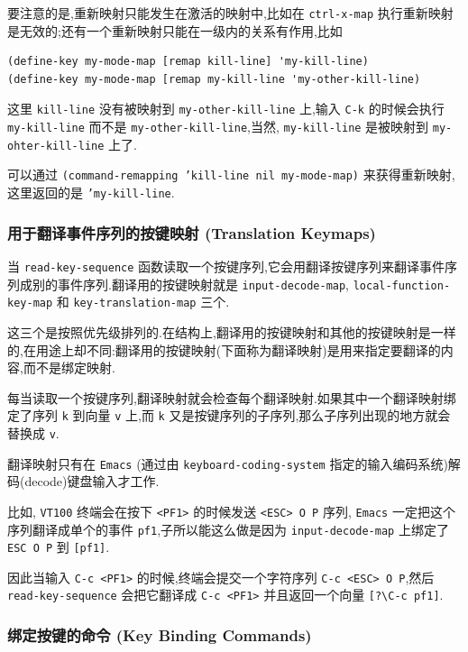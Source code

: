 \documentclass[11pt]{article}
\begin{document}
要注意的是,重新映射只能发生在激活的映射中,比如在 \texttt{ctrl-x-map} 执行重新映射是无效的;还有一个重新映射只能在一级内的关系有作用,比如

\begin{verbatim}
(define-key my-mode-map [remap kill-line] 'my-kill-line)
(define-key my-mode-map [remap my-kill-line 'my-other-kill-line)
\end{verbatim}

这里 \texttt{kill-line} 没有被映射到 \texttt{my-other-kill-line} 上,输入 \texttt{C-k} 的时候会执行 \texttt{my-kill-line} 而不是 \texttt{my-other-kill-line},当然, \texttt{my-kill-line} 是被映射到 \texttt{my-ohter-kill-line} 上了.

可以通过 \texttt{(command-remapping 'kill-line nil my-mode-map)} 来获得重新映射,这里返回的是 \texttt{'my-kill-line}.



\subsubsection{用于翻译事件序列的按键映射 (Translation Keymaps)}
\label{sec:orgfe4ae88}

当 \texttt{read-key-sequence} 函数读取一个按键序列,它会用翻译按键序列来翻译事件序列成别的事件序列.翻译用的按键映射就是 \texttt{input-decode-map}, \texttt{local-function-key-map} 和 \texttt{key-translation-map} 三个.

这三个是按照优先级排列的.在结构上,翻译用的按键映射和其他的按键映射是一样的,在用途上却不同:翻译用的按键映射(下面称为翻译映射)是用来指定要翻译的内容,而不是绑定映射.

每当读取一个按键序列,翻译映射就会检查每个翻译映射.如果其中一个翻译映射绑定了序列 \texttt{k} 到向量 \texttt{v} 上,而 \texttt{k} 又是按键序列的子序列,那么子序列出现的地方就会替换成 \texttt{v}.

翻译映射只有在 \texttt{Emacs} (通过由 \texttt{keyboard-coding-system} 指定的输入编码系统)解码(decode)键盘输入才工作.

比如, \texttt{VT100} 终端会在按下 \texttt{<PF1>} 的时候发送 \texttt{<ESC> O P} 序列, \texttt{Emacs} 一定把这个序列翻译成单个的事件 \texttt{pf1},子所以能这么做是因为 \texttt{input-decode-map} 上绑定了 \texttt{ESC O P} 到 \texttt{[pf1]}.

因此当输入 \texttt{C-c <PF1>} 的时候,终端会提交一个字符序列 \texttt{C-c <ESC> O P},然后 \texttt{read-key-sequence} 会把它翻译成 \texttt{C-c <PF1>} 并且返回一个向量 \texttt{[?\textbackslash{}C-c pf1]}.


\subsubsection{绑定按键的命令 (Key Binding Commands)}
\label{sec:orgbd50191}
\end{document}
